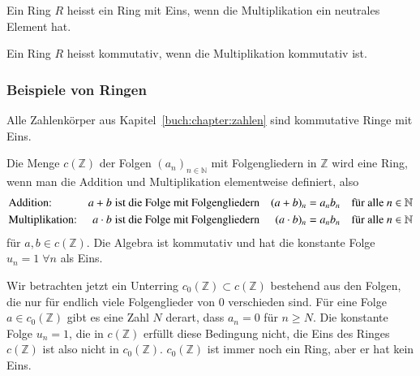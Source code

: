 \begin{definition}
%
Ein Ring $R$ heisst ein Ring mit Eins, wenn die Multiplikation ein
neutrales Element hat.
\end{definition}

\begin{definition}
%
%
Ein Ring $R$ heisst kommutativ, wenn die Multiplikation kommutativ
ist.
\end{definition}

\subsubsection{Beispiele von Ringen}

\begin{beispiel}
Alle Zahlenkörper aus Kapitel~\ref{buch:chapter:zahlen} sind kommutative
Ringe mit Eins.
\end{beispiel}

\begin{beispiel}
Die Menge $c(\mathbb{Z})$ der Folgen $(a_n)_{n\in\mathbb{N}}$ mit
Folgengliedern in $\mathbb{Z}$ wird eine Ring, wenn man die Addition
und Multiplikation elementweise definiert, also
\begin{align*}
&\text{Addition:}
&
a+b&\text{\;ist die Folge mit Folgengliedern}&
(a+b)_n &= a_nb_n \quad\text{für alle $n\in\mathbb{N}$}
\\
&\text{Multiplikation:}
&
a\cdot b&\text{\;ist die Folge mit Folgengliedern}&
(a\cdot b)_n &=  a_nb_n \quad\text{für alle $n\in\mathbb{N}$}
\end{align*}
für $a,b\in c(\mathbb{Z})$.
Die Algebra ist kommutativ und hat die konstante Folge 
$u_n = 1\;\forall n$ als Eins.

Wir betrachten jetzt ein Unterring $c_0(\mathbb{Z})\subset c(\mathbb{Z})$
bestehend aus den Folgen, die nur für endlich viele Folgenglieder von
$0$ verschieden sind.
Für eine Folge $a\in c_0(\mathbb{Z})$ gibt es eine Zahl $N$ derart, dass
$a_n=0$ für $n\ge N$.
Die konstante Folge $u_n=1$, die in $c(\mathbb{Z})$ erfüllt diese
Bedingung nicht, die Eins des Ringes $c(\mathbb{Z})$ ist also nicht in
$c_0(\mathbb{Z})$.
$c_0(\mathbb{Z})$ ist immer noch ein Ring, aber er hat kein Eins.
\end{beispiel}

